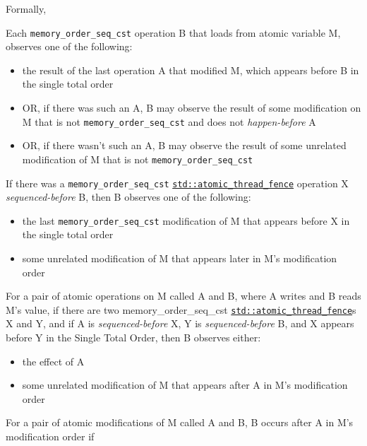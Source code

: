 \documentclass[a4paper,12pt,notitlepage,twoside,openright]{article}
\begin{document}
\begin{oframed}
\marginnote{\textcolor{ForestGreen}{(until C++20)}}
Formally,

Each \texttt{memory\_order\_seq\_cst} operation B that loads from atomic variable
M, observes one of the following:

\begin{itemize}
\item
  the result of the last operation A that modified M, which appears
  before B in the single total order
\item
  OR, if there was such an A, B may observe the result of some
  modification on M that is not \texttt{memory\_order\_seq\_cst} and does not
  \emph{happen-before} A
\item
  OR, if there wasn't such an A, B may observe the result of some
  unrelated modification of M that is not \texttt{memory\_order\_seq\_cst}
\end{itemize}

If there was a \texttt{memory\_order\_seq\_cst}
\href{https://en.cppreference.com/w/cpp/atomic/atomic_thread_fence}{\texttt{std::atomic\_thread\_fence}}
operation X \emph{sequenced-before} B, then B observes one of the
following:

\begin{itemize}
\item
  the last \texttt{memory\_order\_seq\_cst} modification of M that appears before
  X in the single total order
\item
  some unrelated modification of M that appears later in M's
  modification order
\end{itemize}

For a pair of atomic operations on M called A and B, where A writes and
B reads M's value, if there are two memory\_order\_seq\_cst
\href{https://en.cppreference.com/w/cpp/atomic/atomic_thread_fence}{\texttt{std::atomic\_thread\_fence}}s
X and Y, and if A is \emph{sequenced-before} X, Y is
\emph{sequenced-before} B, and X appears before Y in the Single Total
Order, then B observes either:

\begin{itemize}
\item
  the effect of A
\item
  some unrelated modification of M that appears after A in M's
  modification order
\end{itemize}

For a pair of atomic modifications of M called A and B, B occurs after A
in M's modification order if


\end{oframed}
\end{document}
